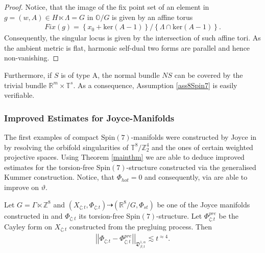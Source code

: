 \documentclass[psamsfonts]{amsart}
\theoremstyle{plain}
\theoremstyle{definition}{
\newtheorem{defi}{Definition}[section]
\newtheorem{ass}{Assumption}
\newtheorem*{nota}{Notation}}
\theoremstyle{remark}{
\newtheorem{rem}{Remark}
\newtheorem{ex}{Example}}
\theoremstyle{plain}{
\newtheorem{thm}{Theorem}[section]
\newtheorem{lem}{Lemma}[section]
\newtheorem{cor}{Corollary}[section]
\newtheorem{prop}{Proposition}[section]
\newtheorem{con}{Conjecture}[section]}
\newcommand{\m}[1]{{\mathrm{#1}}}
\begin{document}
\begin{proof}
    Notice, that the image of the fix point set of an element in $g=(w,A)\in H\ltimes \Lambda=G$ in $\mathbb{O}/G$ is given by an affine torus 
    \begin{align*}
        Fix(g)=\left\{x_0+\m{ker}(A-1)\right\}/\left\{\Lambda\cap\m{ker}(A-1)\right\}.
    \end{align*}
    Consequently, the singular locus is given by the intersection of such affine tori. As the ambient metric is flat, harmonic self-dual two forms are parallel and hence non-vanishing.
\end{proof}

\begin{rem}
Furthermore, if $S$ is of type A, the normal bundle $NS$ can be covered by the trivial bundle $\mathbb{R}^m\times \mathbb{T}^s$. As a consequence, Assumption \ref{ass8Spin7} is easily verifiable. 
\end{rem}


\subsubsection{Improved Estimates for Joyce-Manifolds}
\label{Improved Estimates for Joyce-Manifolds}

The first examples of compact $\m{Spin}(7)$-manifolds were constructed by Joyce in \cite{Joyce1996b} by resolving the orbifold singularities of $\mathbb{T}^8/\mathbb{Z}^4_2$ and the ones of certain weighted projective spaces. Using Theorem \ref{mainthm} we are able to deduce improved estimates for the torsion-free $\m{Spin}(7)$-structure constructed via the generalised Kummer construction. Notice, that $\Phi_{hot}=0$ and consequently, via are able to improve on $\vartheta$.


\begin{thm}
Let $G=\Gamma\ltimes\mathbb{Z}^8$ and $(X_{\zeta;t},\Phi_{\zeta;t})\dashrightarrow (\mathbb{R}^8/G,\Phi_{st})$ be one of the Joyce manifolds constructed in \cite{Joyce1996b} and $\Phi_{\zeta;t}$ its torsion-free $\m{Spin}(7)$-structure. Let $\Phi^{pre}_{\zeta;t}$ be the Cayley form on $X_{\zeta;t}$ constructed from the pregluing process. Then 
\begin{align*}
    \left|\left|\Phi_{\zeta;t}-\Phi^{pre}_{\zeta;t}\right|\right|_{\mathfrak{D}^{1,\alpha}_{\beta;t}}\lesssim t^{\approx4}.
\end{align*}
\end{thm}
\end{document}
